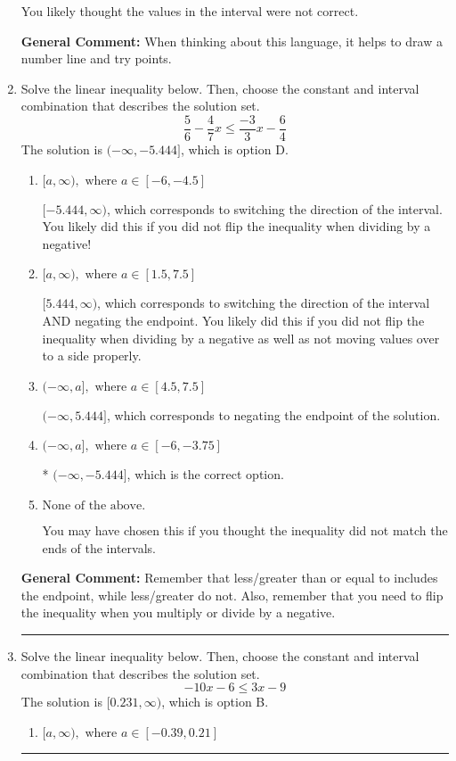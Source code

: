 \documentclass{extbook}[14pt]
\newcommand{\litem}[1]{\item #1

\rule{\textwidth}{0.4pt}}
\begin{document}
\begin{enumerate}
{\begin{enumerate}[label=\Alph*.]
You likely thought the values in the interval were not correct.
\end{enumerate}

\textbf{General Comment:} When thinking about this language, it helps to draw a number line and try points.
}
\litem{
Solve the linear inequality below. Then, choose the constant and interval combination that describes the solution set.
\[ \frac{5}{6} - \frac{4}{7} x \leq \frac{-3}{3} x - \frac{6}{4} \]The solution is \( (-\infty, -5.444] \), which is option D.\begin{enumerate}[label=\Alph*.]
\item \( [a, \infty), \text{ where } a \in [-6, -4.5] \)

 $[-5.444, \infty)$, which corresponds to switching the direction of the interval. You likely did this if you did not flip the inequality when dividing by a negative!
\item \( [a, \infty), \text{ where } a \in [1.5, 7.5] \)

 $[5.444, \infty)$, which corresponds to switching the direction of the interval AND negating the endpoint. You likely did this if you did not flip the inequality when dividing by a negative as well as not moving values over to a side properly.
\item \( (-\infty, a], \text{ where } a \in [4.5, 7.5] \)

 $(-\infty, 5.444]$, which corresponds to negating the endpoint of the solution.
\item \( (-\infty, a], \text{ where } a \in [-6, -3.75] \)

* $(-\infty, -5.444]$, which is the correct option.
\item \( \text{None of the above}. \)

You may have chosen this if you thought the inequality did not match the ends of the intervals.
\end{enumerate}

\textbf{General Comment:} Remember that less/greater than or equal to includes the endpoint, while less/greater do not. Also, remember that you need to flip the inequality when you multiply or divide by a negative.
}
\litem{
Solve the linear inequality below. Then, choose the constant and interval combination that describes the solution set.
\[ -10x -6 \leq 3x -9 \]The solution is \( [0.231, \infty) \), which is option B.\begin{enumerate}[label=\Alph*.]
\item \( [a, \infty), \text{ where } a \in [-0.39, 0.21] \)


\end{enumerate}}
\end{enumerate}
\end{document}

